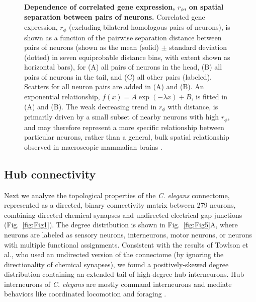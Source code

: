 \documentclass[10pt,letterpaper]{article}
\begin{document}
\begin{figure}[h]
  \centering
  \caption{
  \textbf{Dependence of correlated gene expression, $r_\phi$, on spatial separation between pairs of neurons.}
  Correlated gene expression, $r_\phi$ (excluding bilateral homologous pairs of neurons), is shown as a function of the pairwise separation distance between pairs of neurons (shown as the mean (solid) $\pm$ standard deviation (dotted) in seven equiprobable distance bins, with extent shown as horizontal bars), for (A) all pairs of neurons in the head, (B) all pairs of neurons in the tail, and (C) all other pairs (labeled).
  Scatters for all neuron pairs are added in (A) and (B).
  An exponential relationship, $f(x) = A\exp(-\lambda x) + B$, is fitted in (A) and (B).
  The weak decreasing trend in $r_\phi$ with distance, is primarily driven by a small subset of nearby neurons with high $r_\phi$, and may therefore represent a more specific relationship between particular neurons, rather than a general, bulk spatial relationship observed in macroscopic mammalian brains \cite{Fulcher:2016ck, Krienen:2016eq}.
\label{fig:Fig4}
  }
\end{figure}

\subsection*{Hub connectivity}

Next we analyze the topological properties of the \emph{C. elegans} connectome, represented as a directed, binary connectivity matrix between 279 neurons, combining directed chemical synapses and undirected electrical gap junctions (Fig.~\ref{fig:Fig1}).
The degree distribution is shown in Fig.~\ref{fig:Fig5}A, where neurons are labeled as sensory neurons, interneurons, motor neurons, or neurons with multiple functional assignments.
Consistent with the results of Towlson et al., who used an undirected version of the connectome (by ignoring the directionality of chemical synapses), we found a positively-skewed degree distribution containing an extended tail of high-degree hub interneurons.
Hub interneurons of \emph{C. elegans} are mostly command interneurons and mediate behaviors like coordinated locomotion and foraging \cite{tsalik2003}.
\end{document}
